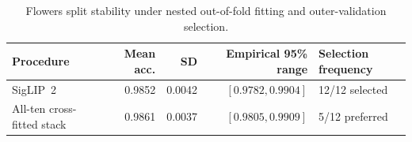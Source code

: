 \begin{table}[!htbp]
\centering\small
\caption{Flowers split stability under nested out-of-fold fitting and outer-validation selection.}
\label{tab:flowers-stability}
\begin{tabular}{lrrrl}
\toprule
Procedure & Mean acc. & SD & Empirical 95\% range & Selection frequency\\
\midrule
SigLIP~2 & 0.9852 & 0.0042 & $[0.9782,0.9904]$ & 12/12 selected\\
All-ten cross-fitted stack & 0.9861 & 0.0037 & $[0.9805,0.9909]$ & 5/12 preferred\\
\bottomrule
\end{tabular}
\end{table}
